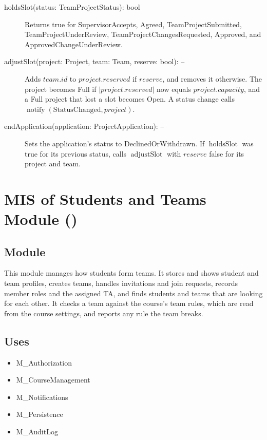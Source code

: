 \documentclass[12pt, titlepage]{article}
\newcommand{\moduleid}[1]{\texttt{\detokenize{#1}}}
\begin{document}
\begin{description}
    \item[holdsSlot(status: TeamProjectStatus): bool] Returns true for SupervisorAccepts, Agreed, TeamProjectSubmitted, TeamProjectUnderReview, TeamProjectChangesRequested, Approved, and ApprovedChangeUnderReview.
    \item[adjustSlot(project: Project, team: Team, reserve: bool): --] Adds $team.id$ to $project.reserved$ if $reserve$, and removes it otherwise. The project becomes Full if $|project.reserved|$ now equals $project.capacity$, and a Full project that lost a slot becomes Open. A status change calls $\operatorname{notify}(\text{StatusChanged},project)$.
    \item[endApplication(application: ProjectApplication): --] Sets the application's status to DeclinedOrWithdrawn. If $\operatorname{holdsSlot}$ was true for its previous status, calls $\operatorname{adjustSlot}$ with $reserve$ false for its project and team.
\end{description}

\newpage

\section[MIS of Students and Teams Module]{MIS of Students and Teams Module (\moduleid{M_StudentsTeams})}
\label{M_StudentsTeams}

\subsection{Module}

This module manages how students form teams. It stores and shows student and team profiles, creates teams, handles invitations and join requests, records member roles and the assigned TA, and finds students and teams that are looking for each other. It checks a team against the course's team rules, which are read from the course settings, and reports any rule the team breaks.

\subsection{Uses}

\begin{itemize}
    \item M\_Authorization
    \item M\_CourseManagement
    \item M\_Notifications
    \item M\_Persistence
    \item M\_AuditLog
\end{itemize}
\end{document}
